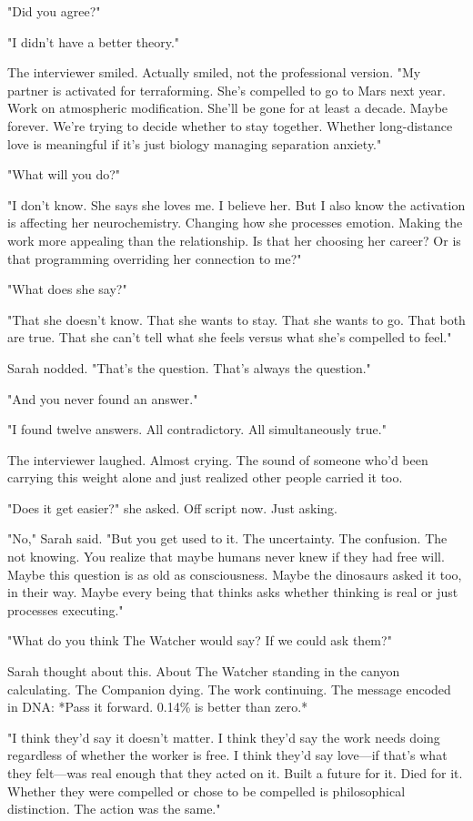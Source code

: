 "Did you agree?"

"I didn't have a better theory."

The interviewer smiled. Actually smiled, not the professional version. "My partner is activated for terraforming. She's compelled to go to Mars next year. Work on atmospheric modification. She'll be gone for at least a decade. Maybe forever. We're trying to decide whether to stay together. Whether long-distance love is meaningful if it's just biology managing separation anxiety."

"What will you do?"

"I don't know. She says she loves me. I believe her. But I also know the activation is affecting her neurochemistry. Changing how she processes emotion. Making the work more appealing than the relationship. Is that her choosing her career? Or is that programming overriding her connection to me?"

"What does she say?"

"That she doesn't know. That she wants to stay. That she wants to go. That both are true. That she can't tell what she feels versus what she's compelled to feel."

Sarah nodded. "That's the question. That's always the question."

"And you never found an answer."

"I found twelve answers. All contradictory. All simultaneously true."

The interviewer laughed. Almost crying. The sound of someone who'd been carrying this weight alone and just realized other people carried it too.

"Does it get easier?" she asked. Off script now. Just asking.

"No," Sarah said. "But you get used to it. The uncertainty. The confusion. The not knowing. You realize that maybe humans never knew if they had free will. Maybe this question is as old as consciousness. Maybe the dinosaurs asked it too, in their way. Maybe every being that thinks asks whether thinking is real or just processes executing."

"What do you think The Watcher would say? If we could ask them?"

Sarah thought about this. About The Watcher standing in the canyon calculating. The Companion dying. The work continuing. The message encoded in DNA: *Pass it forward. 0.14\% is better than zero.*

"I think they'd say it doesn't matter. I think they'd say the work needs doing regardless of whether the worker is free. I think they'd say love—if that's what they felt—was real enough that they acted on it. Built a future for it. Died for it. Whether they were compelled or chose to be compelled is philosophical distinction. The action was the same."

